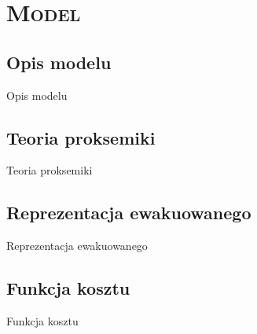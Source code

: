 \section{\scshape Model}

\subsection{Opis modelu}
\begin{frame}{Opis modelu}
\end{frame}

\subsection{Teoria proksemiki}
\begin{frame}{Teoria proksemiki}
\end{frame}

\subsection{Reprezentacja ewakuowanego}
\begin{frame}{Reprezentacja ewakuowanego}
\end{frame}

\subsection{Funkcja kosztu}
\begin{frame}{Funkcja kosztu}
\end{frame}